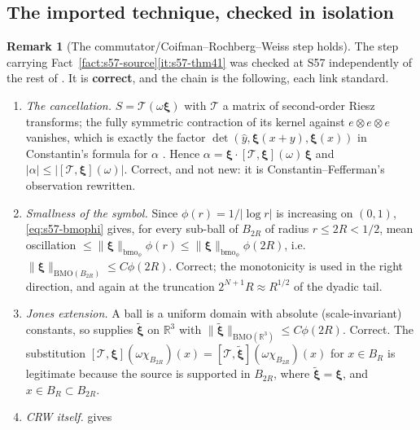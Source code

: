 \documentclass[11pt]{article}
\theoremstyle{definition}
\newtheorem{remark}[theorem]{Remark}
\theoremstyle{remark}
\newcommand{\R}{\mathbb{R}}
\begin{document}
\subsection{The imported technique, checked in isolation}
\label{subsec:s57-crw}

\begin{remark}[The commutator/Coifman--Rochberg--Weiss step holds]
  \label{rem:s57-crw}
  The step carrying Fact~\ref{fact:s57-source}\ref{it:s57-thm41} was checked
  at S57 independently of the rest of \cite{Grujic2026Log}. It is
  \textbf{correct}, and the chain is the following, each link standard.
  \begin{enumerate}[label=\textup{(\arabic*)},leftmargin=2.6em]
  \item \emph{The cancellation.} $S=\mathcal T(\omega\boldsymbol\xi)$ with
    $\mathcal T$ a matrix of second-order Riesz transforms; the fully
    symmetric contraction of its kernel against $e\otimes e\otimes e$
    vanishes, which is exactly the factor
    $\det(\hat y,\boldsymbol\xi(x+y),\boldsymbol\xi(x))$ in
    Constantin's formula for $\alpha$ \cite{Constantin1994,
    ConstantinFefferman1993}. Hence $\alpha=\boldsymbol\xi\cdot
    [\mathcal T,\boldsymbol\xi](\omega)\,\boldsymbol\xi$ and
    $|\alpha|\leq|[\mathcal T,\boldsymbol\xi](\omega)|$. Correct, and not new:
    it is Constantin--Fefferman's observation rewritten.
  \item \emph{Smallness of the symbol.} Since $\phi(r)=1/|\log r|$ is
    increasing on $(0,1)$, \eqref{eq:s57-bmophi} gives, for every sub-ball of
    $B_{2R}$ of radius $r\leq2R<1/2$, mean oscillation
    $\leq\|\boldsymbol\xi\|_{\mathrm{bmo}_\phi}\phi(r)
    \leq\|\boldsymbol\xi\|_{\mathrm{bmo}_\phi}\phi(2R)$, i.e.\
    $\|\boldsymbol\xi\|_{\mathrm{BMO}(B_{2R})}\leq C\phi(2R)$. Correct; the
    monotonicity is used in the right direction, and again at the truncation
    $2^{N+1}R\approx R^{1/2}$ of the dyadic tail.
  \item \emph{Jones extension.} A ball is a uniform domain with absolute
    (scale-invariant) constants, so \cite{Jones1980} supplies
    $\tilde{\boldsymbol\xi}$ on $\R^3$ with
    $\|\tilde{\boldsymbol\xi}\|_{\mathrm{BMO}(\R^3)}\leq C\phi(2R)$. Correct.
    The substitution
    $[\mathcal T,\boldsymbol\xi](\omega\chi_{B_{2R}})(x)
    =[\mathcal T,\tilde{\boldsymbol\xi}](\omega\chi_{B_{2R}})(x)$ for
    $x\in B_R$ is legitimate because the source is supported in $B_{2R}$,
    where $\tilde{\boldsymbol\xi}=\boldsymbol\xi$, and $x\in B_R\subset
    B_{2R}$.
  \item \emph{CRW itself.} \cite{CRW1976} gives

\end{enumerate}
\end{remark}
\end{document}
